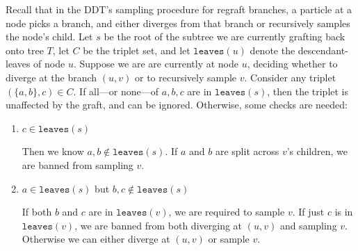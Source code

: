 Recall that in the DDT's sampling procedure for regraft branches,
a particle at a node picks a branch, and either diverges from that
branch or recursively samples the node's child.
Let $s$ be the root of the subtree we are currently grafting 
back onto tree $T$, let $C$ be the
triplet set, and let $\texttt{leaves}(u)$
denote the descendant-leaves of node $u$.
Suppose we are are currently at node $u$,
deciding whether to diverge
at the branch $(u, v)$ or to recursively sample $v$.
Consider any triplet $(\{a, b\}, c) \in C$. If all---or none---of $a,b,c$ are in $\texttt{leaves}(s)$, then the triplet is 
unaffected by the graft, and can be ignored. Otherwise, 
some checks are needed:
\begin{enumerate}
\item $c \in \texttt{leaves}(s)$

Then we know $a,b \not\in \texttt{leaves}(s)$. If $a$ and $b$ are split across $v$'s children,
we are banned from sampling $v$.

\item $a \in \texttt{leaves}(s)$ but $b,c \not\in \texttt{leaves}(s)$

If both $b$ and $c$ are in $\texttt{leaves}(v)$, we are
required to sample $v$.
If just $c$ is in $\texttt{leaves}(v)$, we are banned
from both diverging at $(u, v)$ and sampling $v$.
Otherwise we can either diverge at $(u, v)$ or sample $v$.

\end{enumerate}

